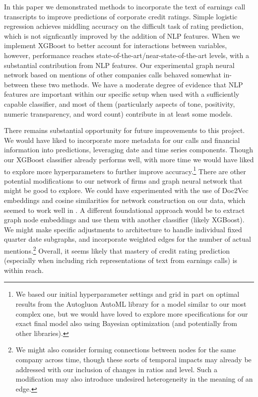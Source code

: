 \documentclass{article}[11pt]
\begin{document}
    In this paper we demonstrated methods to incorporate the text of earnings call transcripts to improve predictions of corporate credit ratings. Simple logistic regression achieves middling accuracy on the difficult task of rating prediction, which is not signficantly improved by the addition of NLP features. When we implement XGBoost to better account for interactions between variables, however, performance reaches state-of-the-art/near-state-of-the-art levels, with a substantial contribution from NLP features. Our experimental graph neural network based on mentions of other companies calls behaved somewhat in-between these two methods. We have a moderate degree of evidence that NLP features are important within our specific setup when used with a sufficiently capable classifier, and most of them (particularly aspects of tone, positivity, numeric transparency, and word count) contribute in at least some models.

    There remains substantial opportunity for future improvements to this project. We would have liked to incorporate more metadata for our calls and financial information into predictions, leveraging date and time series components. Though our XGBoost classifier already performs well, with more time we would have liked to explore more hyperparameters to further improve accuracy.\footnote{We based our initial hyperparameter settings and grid in part on optimal results from the Autogluon AutoML library \citep{erickson_autogluon_2024} for a model similar to our most complex one, but we would have loved to explore more specifications for our exact final model also using Bayesian optimization (and potentially from other libraries).} There are other potential modifications to our network of firms and graph neural network that might be good to explore. We could have experimented with the use of Doc2Vec embeddings and cosine similarities for network construction on our data, which seemed to work well in \cite{das_credit_2023}. A different foundational approach would be to extract graph node embeddings and use them with another classifier (likely XGBoost). We might make specific adjustments to architecture to handle individual fixed quarter date subgraphs, and incorporate weighted edges for the number of actual mentions.\footnote{We might also consider forming connections between nodes for the same company across time, though these sorts of temporal impacts may already be addressed with our inclusion of changes in ratios and level. Such a modification may also introduce undesired heterogeneity in the meaning of an edge.} Overall, it seems likely that mastery of credit rating prediction (especially when including rich representations of text from earnings calls) is within reach.
\end{document}
